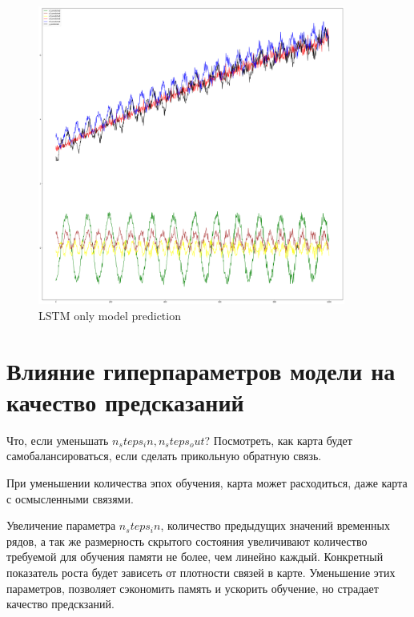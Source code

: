 \begin{figure}
	\centering
	\includegraphics[width=0.9\textwidth]{./img/lstm_only_prediction.png}
	\caption{LSTM only model prediction}
	\label{pic:lstm_only_prediction}
\end{figure}





\section{Влияние гиперпараметров модели на качество предсказаний}

Что, если уменьшать $ n_steps_in, n_steps_out $?
Посмотреть, как карта будет самобалансироваться, если сделать прикольную обратную связь.

При уменьшении количества эпох обучения, карта может расходиться, даже карта с осмысленными связями.

Увеличение параметра $ n_steps_in $, количество предыдущих значений временных рядов,
а так же размерность скрытого состояния увеличивают количество требуемой для обучения
памяти не более, чем линейно каждый. Конкретный показатель роста будет зависеть от
плотности связей в карте.
Уменьшение этих параметров, позволяет сэкономить память и ускорить обучение,
но страдает качество предскзаний.


